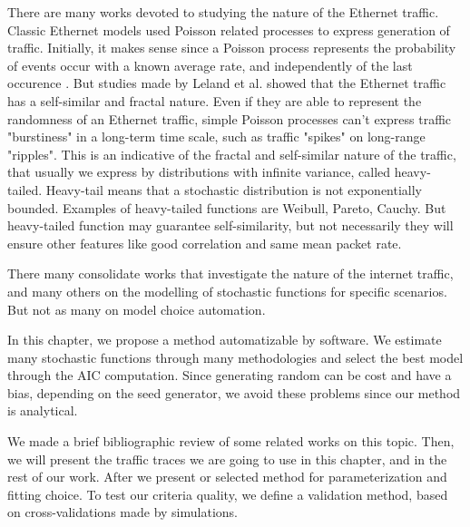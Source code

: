 There are many works devoted to studying the nature of the Ethernet traffic\cite{selfsimilar-ethernet}. Classic Ethernet models used Poisson related processes to express generation of traffic. Initially, it makes sense since a Poisson process represents the probability of events occur with a known average rate, and independently of the last occurence\cite{selfsimilar-ethernet} \cite{book-poisson}. But studies made by Leland et al.\cite{selfsimilar-ethernet} showed that the Ethernet traffic has a self-similar and fractal nature. Even if they are able to represent the randomness of an Ethernet traffic, simple Poisson processes can't express traffic "burstiness" in a long-term time scale, such as traffic "spikes" on long-range "ripples". This is an indicative of the fractal and self-similar nature of the traffic, that usually we express by distributions with infinite variance, called heavy-tailed. Heavy-tail means that a stochastic distribution is not exponentially bounded\cite{sourcesonoff-paper}. Examples of heavy-tailed functions are Weibull, Pareto, Cauchy.  But heavy-tailed function may guarantee self-similarity, but not necessarily they will ensure other features like good correlation and same mean packet rate.

There many consolidate works that investigate the nature of the internet traffic\cite{selfsimilar-ethernet}\cite{analysis-self-similar}\cite{stochartic-selfsimilar}\cite{selfsimilar-highvariability}\cite{multi-player-online-game-self-similarity}, and many others on the modelling of stochastic functions for specific scenarios\cite{estimation-renewal-function-ethernet-traffic}\cite{modelling-of-self-similar}\cite{empirical-interarrival-study}\cite{modeling-concurrent-heavy-tailed}\cite{optimal-scheduling-of-heavy-tailed-traffic}\cite{modelling-of-self-similar}. But not as many on model choice automation\cite{sourcesonoff-paper}.

In this chapter, we propose a method automatizable by  software. We estimate many stochastic functions through many methodologies and select the best model through the AIC computation\cite{bic-aic-comparision}. Since generating random can be cost and have a bias, depending on the seed generator, we avoid these problems since our method is analytical. 

We made a brief bibliographic review of some related works on this topic. Then, we will present the traffic traces we are going to use in this chapter, and in the rest of our work. After we present or selected method for parameterization and fitting choice. To test our criteria quality, we define a validation method, based on cross-validations made by simulations.


